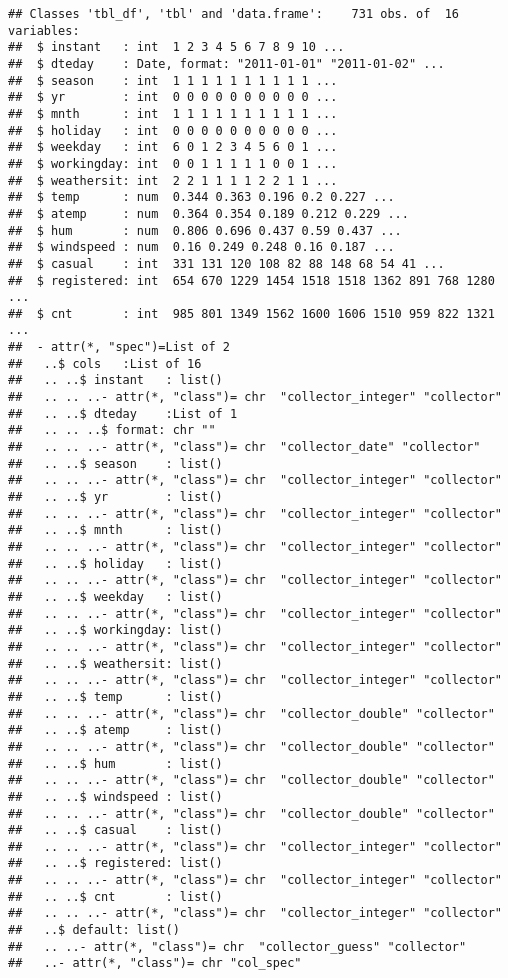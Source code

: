 \documentclass[]{article}
\begin{document}
\begin{verbatim}
## Classes 'tbl_df', 'tbl' and 'data.frame':    731 obs. of  16 variables:
##  $ instant   : int  1 2 3 4 5 6 7 8 9 10 ...
##  $ dteday    : Date, format: "2011-01-01" "2011-01-02" ...
##  $ season    : int  1 1 1 1 1 1 1 1 1 1 ...
##  $ yr        : int  0 0 0 0 0 0 0 0 0 0 ...
##  $ mnth      : int  1 1 1 1 1 1 1 1 1 1 ...
##  $ holiday   : int  0 0 0 0 0 0 0 0 0 0 ...
##  $ weekday   : int  6 0 1 2 3 4 5 6 0 1 ...
##  $ workingday: int  0 0 1 1 1 1 1 0 0 1 ...
##  $ weathersit: int  2 2 1 1 1 1 2 2 1 1 ...
##  $ temp      : num  0.344 0.363 0.196 0.2 0.227 ...
##  $ atemp     : num  0.364 0.354 0.189 0.212 0.229 ...
##  $ hum       : num  0.806 0.696 0.437 0.59 0.437 ...
##  $ windspeed : num  0.16 0.249 0.248 0.16 0.187 ...
##  $ casual    : int  331 131 120 108 82 88 148 68 54 41 ...
##  $ registered: int  654 670 1229 1454 1518 1518 1362 891 768 1280 ...
##  $ cnt       : int  985 801 1349 1562 1600 1606 1510 959 822 1321 ...
##  - attr(*, "spec")=List of 2
##   ..$ cols   :List of 16
##   .. ..$ instant   : list()
##   .. .. ..- attr(*, "class")= chr  "collector_integer" "collector"
##   .. ..$ dteday    :List of 1
##   .. .. ..$ format: chr ""
##   .. .. ..- attr(*, "class")= chr  "collector_date" "collector"
##   .. ..$ season    : list()
##   .. .. ..- attr(*, "class")= chr  "collector_integer" "collector"
##   .. ..$ yr        : list()
##   .. .. ..- attr(*, "class")= chr  "collector_integer" "collector"
##   .. ..$ mnth      : list()
##   .. .. ..- attr(*, "class")= chr  "collector_integer" "collector"
##   .. ..$ holiday   : list()
##   .. .. ..- attr(*, "class")= chr  "collector_integer" "collector"
##   .. ..$ weekday   : list()
##   .. .. ..- attr(*, "class")= chr  "collector_integer" "collector"
##   .. ..$ workingday: list()
##   .. .. ..- attr(*, "class")= chr  "collector_integer" "collector"
##   .. ..$ weathersit: list()
##   .. .. ..- attr(*, "class")= chr  "collector_integer" "collector"
##   .. ..$ temp      : list()
##   .. .. ..- attr(*, "class")= chr  "collector_double" "collector"
##   .. ..$ atemp     : list()
##   .. .. ..- attr(*, "class")= chr  "collector_double" "collector"
##   .. ..$ hum       : list()
##   .. .. ..- attr(*, "class")= chr  "collector_double" "collector"
##   .. ..$ windspeed : list()
##   .. .. ..- attr(*, "class")= chr  "collector_double" "collector"
##   .. ..$ casual    : list()
##   .. .. ..- attr(*, "class")= chr  "collector_integer" "collector"
##   .. ..$ registered: list()
##   .. .. ..- attr(*, "class")= chr  "collector_integer" "collector"
##   .. ..$ cnt       : list()
##   .. .. ..- attr(*, "class")= chr  "collector_integer" "collector"
##   ..$ default: list()
##   .. ..- attr(*, "class")= chr  "collector_guess" "collector"
##   ..- attr(*, "class")= chr "col_spec"
\end{verbatim}
\end{document}
